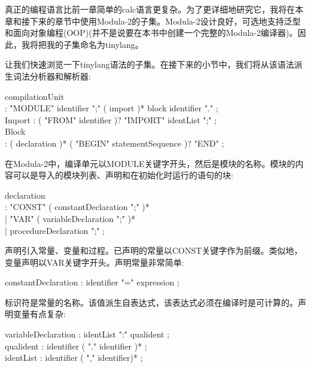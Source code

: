 真正的编程语言比前一章简单的calc语言更复杂。为了更详细地研究它，我将在本章和接下来的章节中使用Modula-2的子集。Modula-2设计良好，可选地支持泛型和面向对象编程(OOP)(并不是说要在本书中创建一个完整的Modula-2编译器)。因此，我将把我的子集命名为tinylang。\par

让我们快速浏览一下tinylang语法的子集。在接下来的小节中，我们将从该语法派生词法分析器和解析器:\par

\begin{tcolorbox}[colback=white,colframe=black]
compilationUnit \\
\hspace*{0.5cm}: "MODULE" identifier ";" ( import )* block identifier "." ; \\
Import : ( "FROM" identifier )? "IMPORT" identList ";" ; \\
Block \\
\hspace*{0.5cm}: ( declaration )* ( "BEGIN" statementSequence )? "END" ;
\end{tcolorbox}

在Modula-2中，编译单元以MODULE关键字开头，然后是模块的名称。模块的内容可以是导入的模块列表、声明和在初始化时运行的语句的块:\par

\begin{tcolorbox}[colback=white,colframe=black]
declaration \\
\hspace*{0.5cm}: "CONST" ( constantDeclaration ";" )* \\
\hspace*{0.5cm}| "VAR" ( variableDeclaration ";" )* \\
\hspace*{0.5cm}| procedureDeclaration ";" ;
\end{tcolorbox}

声明引入常量、变量和过程。已声明的常量以CONST关键字作为前缀。类似地，变量声明以VAR关键字开头。声明常量非常简单:\par

\begin{tcolorbox}[colback=white,colframe=black]
constantDeclaration : identifier "=" expression ;
\end{tcolorbox}

标识符是常量的名称。该值派生自表达式，该表达式必须在编译时是可计算的。声明变量有点复杂:\par

\begin{tcolorbox}[colback=white,colframe=black]
variableDeclaration : identList ":" qualident ; \\
qualident : identifier ( "." identifier )* ; \\
identList : identifier ( "," identifier)* ;
\end{tcolorbox}

